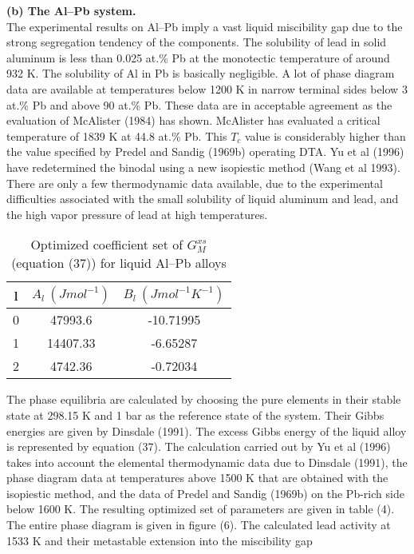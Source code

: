 \documentclass[12pt]{article}
\newcommand*{\1}{\hspace{1pt}}
\begin{document}
\textbf{(b) The Al–Pb system.} \\

The experimental results on Al–Pb imply a vast liquid
miscibility gap due to the strong segregation tendency of the components. The solubility of
lead in solid aluminum is less than 0.025 at.\% Pb at the monotectic temperature of around
932 K. The solubility of Al in Pb is basically negligible. A lot of phase diagram data are
available at temperatures below 1200 K in narrow terminal sides below 3 at.\% Pb and above 90 
at.\% Pb. These data are in acceptable agreement as the evaluation of McAlister (1984) has 
shown. McAlister has evaluated a critical temperature of 1839 K at 44.8 at.\% Pb. This $T _c$
value is considerably higher than the value specified by Predel and Sandig (1969b) operating
DTA. Yu et al (1996) have redetermined the binodal using a new isopiestic method (Wang et al 
1993). There are only a few thermodynamic data available, due to the experimental
difficulties associated with the small solubility of liquid aluminum and lead, and the high
vapor pressure of lead at high temperatures.\\ 
\begin{table}[t!]
    \centering
    \caption{Optimized coefficient set of $G ^ {xs} _ {M}$ 
    (equation (37)) for liquid Al–Pb alloys}
     \begin{tabular}{|c c c|} 
     \hline
     l & $A_l \ (J mol^{-1})$ & $B_l \ (J mol^{-1}K^{-1})$ \\ [0.5ex] 
     \hline\hline
     0 & 47993.6 & -10.71995  \\ 
     1 & 14407.33 & -6.65287  \\
     2 & 4742.36 & -0.72034  \\ [1ex] 
     \hline
     \end{tabular}
    \end{table}

The phase equilibria are calculated by choosing the pure elements in their stable state at 
298.15 K and 1 bar as the reference state of the system. Their Gibbs energies are given by 
Dinsdale (1991). The excess Gibbs energy of the liquid alloy is represented by equation (37). 
The calculation carried out by Yu et al (1996) takes into account the elemental thermodynamic 
data due to Dinsdale (1991), the phase diagram data at
temperatures above 1500 K that are obtained with the isopiestic method, and the data of Predel 
and Sandig (1969b) on the Pb-rich side below 1600 K. The resulting optimized set of parameters 
are given in table (4). The entire phase diagram is given in figure (6). The
calculated lead activity at 1533 K and their metastable extension into the miscibility gap

\begin{adjustbox}{center,caption={Calculated phase diagram (continuous curve) using the 
    coefficient set given in table 4.},label={somelabel},nofloat=figure,vspace=\bigskipamount}
\end{adjustbox}
\end{document}

